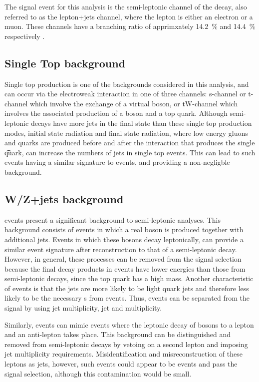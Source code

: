 The signal event for this analysis is the semi-leptonic channel of the \ttbar decay, also referred to as
the lepton+jets channel, where the lepton is either an electron or a muon. These channels have a branching
ratio of apprimxately 14.2~\% and 14.4~\% respectively \cite{Agashe:2014kda}.

\subsection{Single Top background}
\label{ss:single_top}
Single top production is one of the backgrounds considered in this analysis, and can occur via the electroweak
interaction in one of three channels: s-channel or t-channel which involve the exchange of a virtual \W boson,
or tW-channel which involves the associated production of a \W boson and a top quark. Although semi-leptonic
\ttbar decays have more jets in the final state than these single top production modes, initial state
radiation and final state radiation, where low energy gluons and quarks are produced before and after the
interaction that produces the single \t quark, can increase the numbers of jets in single top events. This can
lead to such events having a similar signature to \ttbar events, and providing a non-negligble background.

\subsection{W/Z+jets background}
\label{ss:w_z_plus_jets}
\WpJets events present a significant background to semi-leptonic \ttbar analyses. This background
consists of events in which a real \W boson is produced together with additional jets. Events in which these
\W bosons decay leptonically, can provide a similar event signature after reconstruction to that of a
semi-leptonic \ttbar decay. However, in general, these processes can be removed from the signal selection
because the final decay products in \WpJets events have lower energies than those from semi-leptonic \ttbar
decays, since the top quark has a high mass. Another characteristic of \WpJets events is that the jets are
more likely to be light quark jets and therefore less likely to be the necessary \bjet s from \ttbar events.
Thus, \WpJets events can be separated from the \ttbar signal by using jet multiplicity, jet \pt and \bjet
multiplicity.

Similarly, \ZpJets events can mimic \ttbar events where the leptonic decay of \Z bosons to a lepton and an
anti-lepton takes place. This background can be distinguished and removed from semi-leptonic \ttbar decays by
vetoing on a second lepton and imposing jet multiplicity requirements. Misidentification and misreconstruction
of these leptons as jets, however, such events could appear to be \ttbar events and pass the signal selection,
although this contamination would be small.

